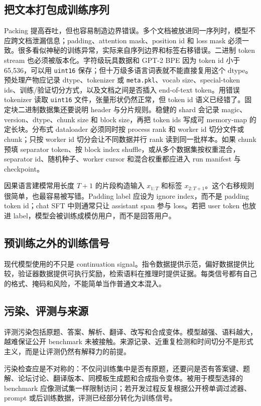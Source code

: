 \documentclass[UTF8,zihao=-4,openany]{ctexbook}
\begin{document}
\subsection{把文本打包成训练序列}
Packing 提高吞吐，但也容易制造边界错误。多个文档被放进同一序列时，模型不应跨文档泄漏信息；padding、attention mask、position id 和 loss mask 必须一致。很多看似神秘的训练异常，实际来自序列边界和标签右移错误。二进制 token stream 也必须被版本化。字符级玩具数据和 GPT-2 BPE 因为 token id 小于 65,536，可以用 \texttt{uint16} 保存；但十万级多语言词表就不能直接复用这个 dtype。预处理产物应记录 dtype、tokenizer 或 \texttt{meta.pkl}、vocab size、special-token ids、训练/验证切分方式，以及文档之间是否插入 end-of-text token。用错误 tokenizer 读取 \texttt{uint16} 文件，张量形状仍然正常，但 token id 语义已经错了。固定块二进制数据集还要说明 header 与分片规则。稳健的 shard 会记录 magic、version、dtype、chunk size 和 block size，再把 token ids 写成可 memory-map 的定长块。分布式 dataloader 必须同时按 process rank 和 worker id 切分文件或 chunk；只按 worker id 切分会让不同数据并行 rank 读到同一批样本。如果 chunk 预填 separator token、按 block index shuffle，或从多个数据集按权重混合，separator id、随机种子、worker cursor 和混合权重都应进入 run manifest 与 checkpoint。

因果语言建模常用长度 $T+1$ 的片段构造输入 $x_{1:T}$ 和标签 $x_{2:T+1}$。这个右移规则很简单，也最容易被写错。Padding label 应设为 ignore index，而不是 padding token id；chat SFT 中则通常只让 assistant span 参与 loss。若把 user token 也放进 label，模型会被训练成模仿用户，而不是回答用户。

\subsection{预训练之外的训练信号}
现代模型使用的不只是 continuation signal。指令数据提供示范，偏好数据提供比较，验证器数据提供可执行奖励，检索语料在推理时提供证据。每类信号都有自己的格式、掩码和风险，不能简单当作普通文本混入。

\subsection{污染、评测与来源}
评测污染包括原题、答案、解析、翻译、改写和合成变体。模型越强、语料越大，越难保证公开 benchmark 未被接触。来源记录、近重复检测和时间切分不是形式主义，而是让评测仍然有解释力的前提。

污染检查应是不对称的：不仅问训练集中是否有原题，还要问是否有答案键、题解、论坛讨论、翻译版本、同模板生成题和合成指令变体。被用于模型选择的 benchmark 应像测试集一样限制访问；若开发过程反复根据公开榜单调过滤器、prompt 或后训练数据，评测已经部分转化为训练信号。
\end{document}
